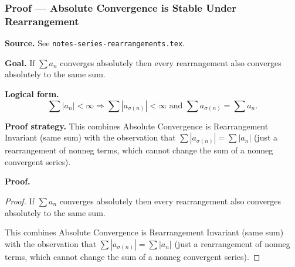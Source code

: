 
\clearpage
{}
\hypertarget{proof-RA-ABB-T-abs-stable-rearrangement}{}

\subsubsection[Absolute Convergence is Stable Under Rearrangement]{Proof --- Absolute Convergence is Stable Under Rearrangement}

\bigskip

\noindent
\textbf{Source.} See \texttt{notes-series-rearrangements.tex}.

\vspace{0.75em}

\noindent
\textbf{Goal.} If $\sum a_n$ converges absolutely then every rearrangement also converges absolutely to the same sum.

\vspace{0.75em}

\noindent
\textbf{Logical form.}
\[
  \sum |a_n| < \infty \Rightarrow \sum |a_{\sigma(n)}| < \infty \text{ and } \sum a_{\sigma(n)} = \sum a_n.
\]

\vspace{0.75em}

\noindent
\textbf{Proof strategy.} This combines Absolute Convergence is Rearrangement Invariant (same sum) with the observation that $\sum |a_{\sigma(n)}| = \sum |a_n|$ (just a rearrangement of nonneg terms, which cannot change the sum of a nonneg convergent series).

\vspace{0.75em}

\noindent
\textbf{Proof.}
\begin{proof}
\Claim If $\sum a_n$ converges absolutely then every rearrangement also converges absolutely to the same sum.

\Given 

\Goal 

\Strategy This combines Absolute Convergence is Rearrangement Invariant (same sum) with the observation that $\sum |a_{\sigma(n)}| = \sum |a_n|$ (just a rearrangement of nonneg terms, which cannot change the sum of a nonneg convergent series).

\medskip


\end{proof}

